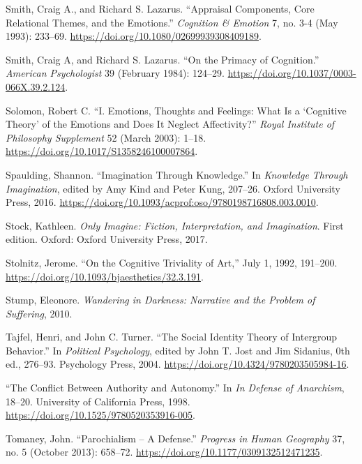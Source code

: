 \documentclass[phdthesis,12pt,final]{wuthesis}
\newlength{\cslhangindent}
\newenvironment{CSLReferences}[2] %
{\begin{list}{}{%
	\setlength{\itemindent}{0pt}
	\setlength{\leftmargin}{0pt}
	\setlength{\parsep}{0pt}
	\ifodd #1
	\setlength{\leftmargin}{\cslhangindent}
	\setlength{\itemindent}{-1\cslhangindent}
	\fi
	\setlength{\itemsep}{#2\baselineskip}}}
{\end{list}}
\theoremstyle{definition}
\theoremstyle{definition}
\theoremstyle{definition}
\theoremstyle{definition}
\theoremstyle{remark}
\begin{document}
\begin{CSLReferences}{1}{0}
Smith, Craig A., and Richard S. Lazarus. {``Appraisal {Components}, {Core Relational Themes}, and the {Emotions}.''} \emph{Cognition \& Emotion} 7, no. 3-4 (May 1993): 233--69. \url{https://doi.org/10.1080/02699939308409189}.

Smith, Craig A, and Richard S. Lazarus. {``On the {Primacy} of {Cognition}.''} \emph{American Psychologist} 39 (February 1984): 124--29. \url{https://doi.org/10.1037/0003-066X.39.2.124}.

Solomon, Robert C. {``I. {Emotions}, {Thoughts} and {Feelings}: {What} Is a {`{Cognitive Theory}'} of the {Emotions} and {Does} It {Neglect Affectivity}?''} \emph{Royal Institute of Philosophy Supplement} 52 (March 2003): 1--18. \url{https://doi.org/10.1017/S1358246100007864}.

Spaulding, Shannon. {``Imagination {Through Knowledge}.''} In \emph{Knowledge {Through Imagination}}, edited by Amy Kind and Peter Kung, 207--26. Oxford University Press, 2016. \url{https://doi.org/10.1093/acprof:oso/9780198716808.003.0010}.

Stock, Kathleen. \emph{Only Imagine: Fiction, Interpretation, and Imagination}. First edition. Oxford: Oxford University Press, 2017.

Stolnitz, Jerome. {``On the {Cognitive Triviality} of {Art},''} July 1, 1992, 191--200. \url{https://doi.org/10.1093/bjaesthetics/32.3.191}.

Stump, Eleonore. \emph{Wandering in {Darkness}: {Narrative} and the {Problem} of {Suffering}}, 2010.

Tajfel, Henri, and John C. Turner. {``The {Social Identity Theory} of {Intergroup Behavior}.''} In \emph{Political {Psychology}}, edited by John T. Jost and Jim Sidanius, 0th ed., 276--93. Psychology Press, 2004. \url{https://doi.org/10.4324/9780203505984-16}.

{``The {Conflict Between Authority} and {Autonomy}.''} In \emph{In {Defense} of {Anarchism}}, 18--20. University of California Press, 1998. \url{https://doi.org/10.1525/9780520353916-005}.

Tomaney, John. {``Parochialism -- {A Defense}.''} \emph{Progress in Human Geography} 37, no. 5 (October 2013): 658--72. \url{https://doi.org/10.1177/0309132512471235}.


\end{CSLReferences}
\end{document}
